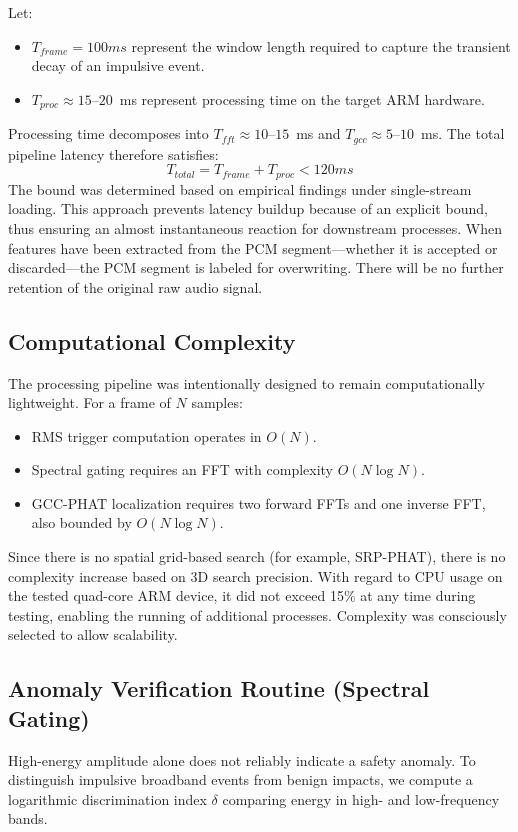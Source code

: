 \documentclass[conference]{IEEEtran}
\begin{document}
Let:
\begin{itemize}
    \item $T_{frame} = 100ms$ represent the window length required to capture the transient decay of an impulsive event.
    \item $T_{proc} \approx 15$--$20$~ms represent processing time on the target ARM hardware.
\end{itemize}

Processing time decomposes into $T_{fft} \approx 10$--$15$~ms and $T_{gcc} \approx 5$--$10$~ms. The total pipeline latency therefore satisfies:
\begin{equation}
T_{total} = T_{frame} + T_{proc} < 120ms
\end{equation}
The bound was determined based on empirical findings under single-stream loading. This approach prevents latency buildup because of an explicit bound, thus ensuring an almost instantaneous reaction for downstream processes. When features have been extracted from the PCM segment—whether it is accepted or discarded—the PCM segment is labeled for overwriting. There will be no further retention of the original raw audio signal.

\subsection{Computational Complexity}
The processing pipeline was intentionally designed to remain computationally lightweight. For a frame of $N$ samples:
\begin{itemize}
    \item RMS trigger computation operates in $O(N)$.
    \item Spectral gating requires an FFT with complexity $O(N \log N)$.
    \item GCC-PHAT localization requires two forward FFTs and one inverse FFT, also bounded by $O(N \log N)$.
\end{itemize}
Since there is no spatial grid-based search (for example, SRP-PHAT), there is no complexity increase based on 3D search precision. With regard to CPU usage on the tested quad-core ARM device, it did not exceed 15\% at any time during testing, enabling the running of additional processes. Complexity was consciously selected to allow scalability.

\subsection{Anomaly Verification Routine (Spectral Gating)}
High-energy amplitude alone does not reliably indicate a safety anomaly. To distinguish impulsive broadband events from benign impacts, we compute a logarithmic discrimination index $\delta$ comparing energy in high- and low-frequency bands.
\end{document}
